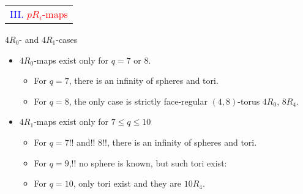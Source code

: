 \documentclass[%
pdf,
colorBG,
slideColor,
]{prosper}
\begin{document}
\begin{slide}{}
\begin{center}
{\Huge 
\begin{tabular*}{7cm}{c}
\\[-0.5cm]
\textcolor{blue}{III. }\textcolor{red}{$pR_i$-maps}
\end{tabular*}
}
\end{center}
\end{slide}

\begin{slide}{$4R_0$- and $4R_1$-cases}
\begin{itemize}
\item $4R_0$-maps exist only for $q=7$ or $8$.
\begin{itemize}
\item For $q=7$, there is an infinity of spheres and tori.
\item For $q=8$, the only case is strictly face-regular $(4,8)$-torus 
$4R_0$, $8R_4$.
\end{itemize}
\item $4R_1$-maps exist only for $7\leq q\leq 10$
\begin{itemize}
\item For $q=7$!! and!! $8$!!, there is an infinity of spheres and tori.
\item For $q=9$,!! no sphere is known, but such tori exist:
\begin{center}
\begin{minipage}{5cm}
\centering
{}\par
\end{minipage}
\end{center}
\item For $q=10$, only tori exist and they are $10R_4$.
\end{itemize}

\end{itemize}

\end{slide}
\end{document}
